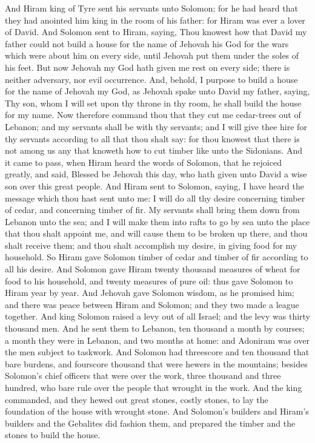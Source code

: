 And Hiram king of Tyre sent his servants unto Solomon; for he had heard that they had anointed him king in the room of his father: for Hiram was ever a lover of David. And Solomon sent to Hiram, saying, Thou knowest how that David my father could not build a house for the name of Jehovah his God for the wars which were about him on every side, until Jehovah put them under the soles of his feet. But now Jehovah my God hath given me rest on every side; there is neither adversary, nor evil occurrence. And, behold, I purpose to build a house for the name of Jehovah my God, as Jehovah spake unto David my father, saying, Thy son, whom I will set upon thy throne in thy room, he shall build the house for my name. Now therefore command thou that they cut me cedar-trees out of Lebanon; and my servants shall be with thy servants; and I will give thee hire for thy servants according to all that thou shalt say: for thou knowest that there is not among us any that knoweth how to cut timber like unto the Sidonians.  And it came to pass, when Hiram heard the words of Solomon, that he rejoiced greatly, and said, Blessed be Jehovah this day, who hath given unto David a wise son over this great people. And Hiram sent to Solomon, saying, I have heard the message which thou hast sent unto me: I will do all thy desire concerning timber of cedar, and concerning timber of fir. My servants shall bring them down from Lebanon unto the sea; and I will make them into rafts to go by sea unto the place that thou shalt appoint me, and will cause them to be broken up there, and thou shalt receive them; and thou shalt accomplish my desire, in giving food for my household. So Hiram gave Solomon timber of cedar and timber of fir according to all his desire. And Solomon gave Hiram twenty thousand measures of wheat for food to his household, and twenty measures of pure oil: thus gave Solomon to Hiram year by year. And Jehovah gave Solomon wisdom, as he promised him; and there was peace between Hiram and Solomon; and they two made a league together.  And king Solomon raised a levy out of all Israel; and the levy was thirty thousand men. And he sent them to Lebanon, ten thousand a month by courses; a month they were in Lebanon, and two months at home: and Adoniram was over the men subject to taskwork. And Solomon had threescore and ten thousand that bare burdens, and fourscore thousand that were hewers in the mountains; besides Solomon’s chief officers that were over the work, three thousand and three hundred, who bare rule over the people that wrought in the work. And the king commanded, and they hewed out great stones, costly stones, to lay the foundation of the house with wrought stone. And Solomon’s builders and Hiram’s builders and the Gebalites did fashion them, and prepared the timber and the stones to build the house. 

